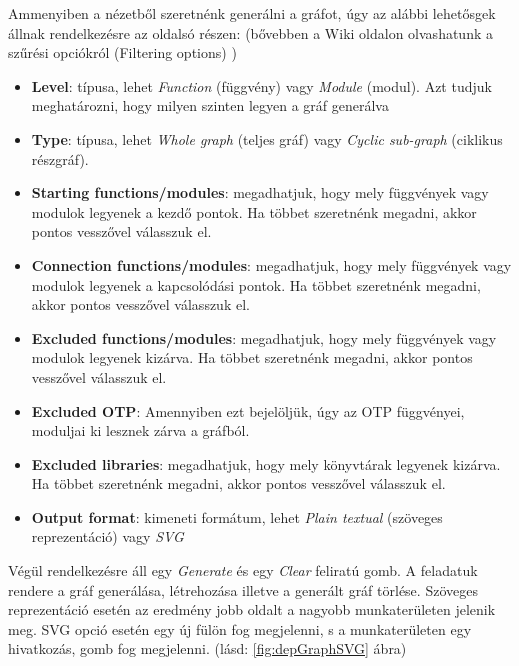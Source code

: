 Ammenyiben a nézetből szeretnénk generálni a gráfot, úgy az alábbi lehetősgek állnak rendelkezésre az oldalsó részen: (bővebben a Wiki oldalon olvashatunk a szűrési opciókról (Filtering options) \cite{referlWikiDependency})

\begin{itemize}
    \item \textbf{Level}: típusa, lehet \textit{Function} (függvény) vagy \textit{Module} (modul). Azt tudjuk meghatározni, hogy milyen szinten legyen a gráf generálva
     \item \textbf{Type}: típusa, lehet \textit{Whole graph} (teljes gráf) vagy \textit{Cyclic sub-graph} (ciklikus részgráf).
     \item \textbf{Starting functions/modules}: megadhatjuk, hogy mely függvények vagy modulok legyenek a kezdő pontok. Ha többet szeretnénk megadni, akkor pontos vesszővel válasszuk el.
     \item \textbf{Connection functions/modules}: megadhatjuk, hogy mely függvények vagy modulok legyenek a kapcsolódási pontok. Ha többet szeretnénk megadni, akkor pontos vesszővel válasszuk el.
     \item \textbf{Excluded functions/modules}: megadhatjuk, hogy mely függvények vagy modulok legyenek kizárva. Ha többet szeretnénk megadni, akkor pontos vesszővel válasszuk el.
     \item \textbf{Excluded OTP}: Amennyiben ezt bejelöljük, úgy az OTP függvényei, moduljai ki lesznek zárva a gráfból.
     \item \textbf{Excluded libraries}: megadhatjuk, hogy mely könyvtárak legyenek kizárva. Ha többet szeretnénk megadni, akkor pontos vesszővel válasszuk el.
     \item \textbf{Output format}: kimeneti formátum, lehet \textit{Plain textual} (szöveges reprezentáció) vagy \textit{SVG} 
\end{itemize}

Végül rendelkezésre áll egy \textit{Generate} és egy \textit{Clear} feliratú gomb. A feladatuk rendere a gráf generálása, létrehozása illetve a generált gráf törlése. Szöveges reprezentáció esetén az eredmény jobb oldalt a nagyobb munkaterületen jelenik meg. SVG opció esetén egy új fülön fog megjelenni, s a munkaterületen egy hivatkozás, gomb fog megjelenni. (lásd: \ref{fig:depGraphSVG} ábra)

